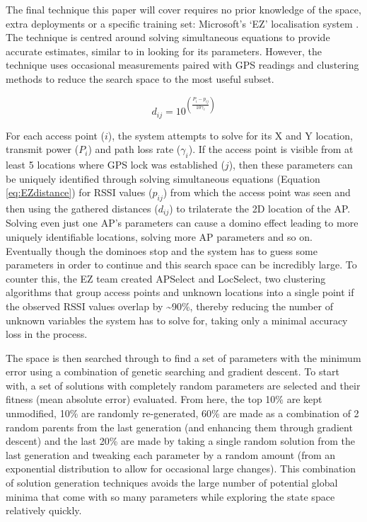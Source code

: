 \documentclass{UoYCSproject}
\begin{document}
                The final technique this paper will cover requires no prior knowledge of the space, extra deployments or a specific training set: Microsoft's `EZ' localisation system \citep{chintalapudi2010indoor}. The technique is centred around solving simultaneous equations to provide accurate estimates, similar to \citet{madigan2005bayesian} in looking for its parameters. However, the technique uses occasional measurements paired with GPS readings and clustering methods to reduce the search space to the most useful subset. 
                
                \begin{equation} \label{eq:EZdistance}
                    d_{ij} = 10^{\left(\frac{P_i - p_{ij}}{10\gamma_i}\right)}
                \end{equation}
                
                For each access point ($i$), the system attempts to solve for its X and Y location, transmit power ($P_i$) and path loss rate ($\gamma_i$). If the access point is visible from at least 5 locations where GPS lock was established ($j$), then these parameters can be uniquely identified through solving simultaneous equations (Equation \ref{eq:EZdistance}) for RSSI values ($p_{ij}$) from which the access point was seen and then using the gathered distances ($d_{ij}$) to trilaterate the 2D location of the AP. Solving even just one AP's parameters can cause a domino effect leading to more uniquely identifiable locations, solving more AP parameters and so on. Eventually though the dominoes stop and the system has to guess some parameters in order to continue and this search space can be incredibly large. To counter this, the EZ team created APSelect and LocSelect, two clustering algorithms that group access points and unknown locations into a single point if the observed RSSI values overlap by \textasciitilde90\%, thereby reducing the number of unknown variables the system has to solve for, taking only a minimal accuracy loss in the process.
                
                The space is then searched through to find a set of parameters with the minimum error using a combination of genetic searching and gradient descent. To start with, a set of solutions with completely random parameters are selected and their fitness (mean absolute error) evaluated. From here, the top 10\% are kept unmodified, 10\% are randomly re-generated, 60\% are made as a combination of 2 random parents from the last generation (and enhancing them through gradient descent) and the last 20\% are made by taking a single random solution from the last generation and tweaking each parameter by a random amount (from an exponential distribution to allow for occasional large changes). This combination of solution generation techniques avoids the large number of potential global minima that come with so many parameters while exploring the state space relatively quickly.
                
\end{document}
